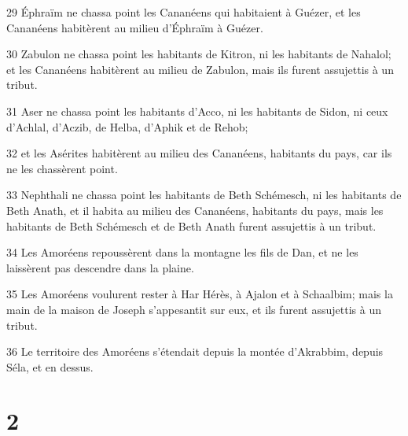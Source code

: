\par 29 Éphraïm ne chassa point les Cananéens qui habitaient à Guézer, et les Cananéens habitèrent au milieu d'Éphraïm à Guézer.
\par 30 Zabulon ne chassa point les habitants de Kitron, ni les habitants de Nahalol; et les Cananéens habitèrent au milieu de Zabulon, mais ils furent assujettis à un tribut.
\par 31 Aser ne chassa point les habitants d'Acco, ni les habitants de Sidon, ni ceux d'Achlal, d'Aczib, de Helba, d'Aphik et de Rehob;
\par 32 et les Asérites habitèrent au milieu des Cananéens, habitants du pays, car ils ne les chassèrent point.
\par 33 Nephthali ne chassa point les habitants de Beth Schémesch, ni les habitants de Beth Anath, et il habita au milieu des Cananéens, habitants du pays, mais les habitants de Beth Schémesch et de Beth Anath furent assujettis à un tribut.
\par 34 Les Amoréens repoussèrent dans la montagne les fils de Dan, et ne les laissèrent pas descendre dans la plaine.
\par 35 Les Amoréens voulurent rester à Har Hérès, à Ajalon et à Schaalbim; mais la main de la maison de Joseph s'appesantit sur eux, et ils furent assujettis à un tribut.
\par 36 Le territoire des Amoréens s'étendait depuis la montée d'Akrabbim, depuis Séla, et en dessus.

\chapter{2}


